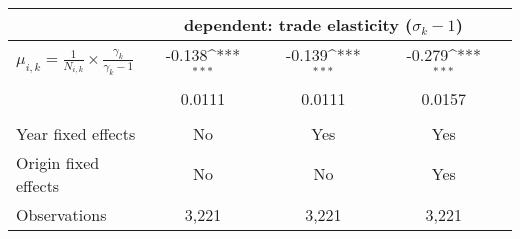 \def\sym#1{\ifmmode^{#1}\else\(^{#1}\)\fi}
\begin{adjustbox}{width=0.7\textwidth}
\begin{tabular}{lcccccc}
\midrule
& \multicolumn{5}{c}{dependent: trade elasticity ($ \sigma_{k} - 1 $)} \\ 
\toprule
$\mu_{i,k}=\frac{1}{N_{i,k}}\times\frac{\gamma_{k}}{\gamma_{k}-1}$ &-0.138\sym{***} &&-0.139\sym{***} &&-0.279\sym{***} \\
&  0.0111&&  0.0111&&  0.0157\\  \\
\addlinespace
Year fixed effects    &   No   &&    Yes    &&   Yes  \\
Origin fixed effects  &   No   &&    No     &&  Yes   \\
Observations        &    3,221&&    3,221&&    3,221 \\ 
\bottomrule
\end{tabular}
\end{adjustbox}